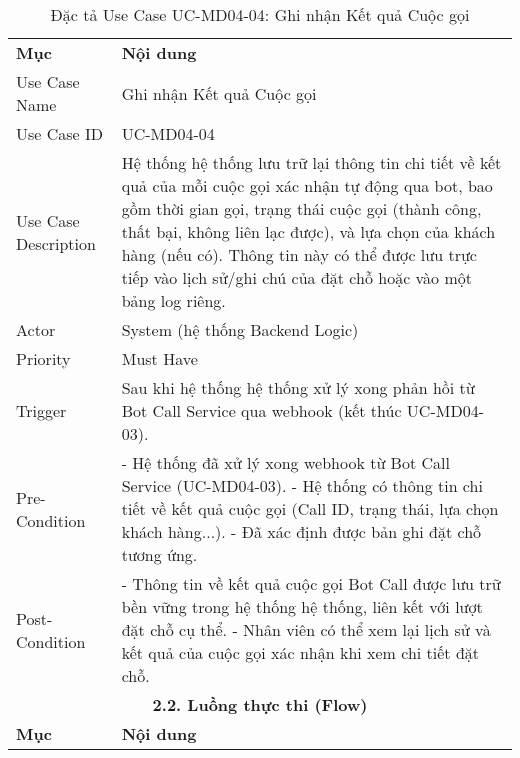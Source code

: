 \begin{longtable}{|m{4cm}|p{11cm}|}
\caption{Đặc tả Use Case UC-MD04-04: Ghi nhận Kết quả Cuộc gọi} \label{tab:uc_md04_04} \\
\hline

\endhead %
\hline
\endfoot %
\hline
\endlastfoot %
\multicolumn{2}{|c|}{\textbf{2.1. Tóm tắt (Summary)}} \\
\hline
\textbf{Mục} & \textbf{Nội dung} \\
\hline
Use Case Name & Ghi nhận Kết quả Cuộc gọi \\
\hline
Use Case ID & UC-MD04-04 \\
\hline
Use Case Description & Hệ thống hệ thống lưu trữ lại thông tin chi tiết về kết quả của mỗi cuộc gọi xác nhận tự động qua bot, bao gồm thời gian gọi, trạng thái cuộc gọi (thành công, thất bại, không liên lạc được), và lựa chọn của khách hàng (nếu có). Thông tin này có thể được lưu trực tiếp vào lịch sử/ghi chú của đặt chỗ hoặc vào một bảng log riêng. \\
\hline
Actor & System (hệ thống Backend Logic) \\
\hline
Priority & Must Have \\
\hline
Trigger & Sau khi hệ thống hệ thống xử lý xong phản hồi từ Bot Call Service qua webhook (kết thúc UC-MD04-03). \\
\hline
Pre-Condition & - Hệ thống đã xử lý xong webhook từ Bot Call Service (UC-MD04-03). \newline - Hệ thống có thông tin chi tiết về kết quả cuộc gọi (Call ID, trạng thái, lựa chọn khách hàng...). \newline - Đã xác định được bản ghi đặt chỗ tương ứng. \\
\hline
Post-Condition & - Thông tin về kết quả cuộc gọi Bot Call được lưu trữ bền vững trong hệ thống hệ thống, liên kết với lượt đặt chỗ cụ thể. \newline - Nhân viên có thể xem lại lịch sử và kết quả của cuộc gọi xác nhận khi xem chi tiết đặt chỗ. \\
\hline
\multicolumn{2}{|c|}{\textbf{2.2. Luồng thực thi (Flow)}} \\
\hline
\textbf{Mục} & \textbf{Nội dung} \\
\hline

\end{longtable}
